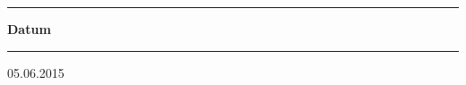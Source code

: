 \begin{titlepage}
\begin{minipage}[b]{0.91\textwidth}
	
	
	\begin{minipage}[b]{0.27\textwidth}
	\hrule\vskip 0.5cm
		\textbf{Datum}
	\end{minipage}
	\begin{minipage}[b]{0.03\textwidth}
	\hskip 0.5cm
	\end{minipage}
	\begin{minipage}[b]{0.7\textwidth}
	\hrule\vskip 0.5cm
		05.06.2015
	\end{minipage}
\end{minipage}
\vskip 0.5cm



\end{titlepage}
